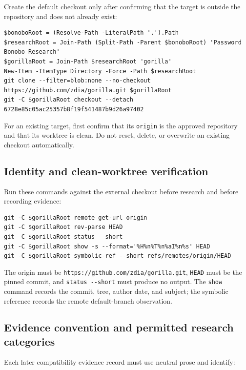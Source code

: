 \documentclass[
  letterpaper,
]{article}
\newcommand{\passthrough}[1]{#1}
\begin{document}
Create the default checkout only after confirming that the target is outside the repository and does not already exist:

\begin{lstlisting}
$bonoboRoot = (Resolve-Path -LiteralPath '.').Path
$researchRoot = Join-Path (Split-Path -Parent $bonoboRoot) 'Password Bonobo Research'
$gorillaRoot = Join-Path $researchRoot 'gorilla'
New-Item -ItemType Directory -Force -Path $researchRoot
git clone --filter=blob:none --no-checkout https://github.com/zdia/gorilla.git $gorillaRoot
git -C $gorillaRoot checkout --detach 6728e85c05ac25357b8f19f541487b9d26a97402
\end{lstlisting}

For an existing target, first confirm that its \passthrough{\lstinline!origin!} is the approved repository and that its
worktree is clean. Do not reset, delete, or overwrite an existing checkout automatically.

\subsection{Identity and clean-worktree verification}\label{identity-and-clean-worktree-verification}

Run these commands against the external checkout before research and before recording evidence:

\begin{lstlisting}
git -C $gorillaRoot remote get-url origin
git -C $gorillaRoot rev-parse HEAD
git -C $gorillaRoot status --short
git -C $gorillaRoot show -s --format='%H%n%T%n%aI%n%s' HEAD
git -C $gorillaRoot symbolic-ref --short refs/remotes/origin/HEAD
\end{lstlisting}

The origin must be \nolinkurl{https://github.com/zdia/gorilla.git}, \passthrough{\lstinline!HEAD!} must be the pinned
commit, and \passthrough{\lstinline!status --short!} must produce no output. The \passthrough{\lstinline!show!} command
records the commit, tree, author date, and subject; the symbolic reference records the remote default-branch
observation.

\subsection{Evidence convention and permitted research
categories}\label{evidence-convention-and-permitted-research-categories}

Each later compatibility evidence record must use neutral prose and identify:
\end{document}
